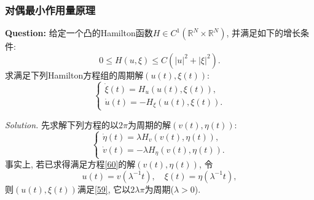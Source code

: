 \subsubsection{对偶最小作用量原理}

\textbf{Question:} 给定一个凸的Hamilton函数$H \in C^1(\mathbb{R}^N \times \mathbb{R}^N)$, 并满足如下的增长条件:
\begin{equation*}
    0 \leq H(u, \xi) \leq C(|u|^2 + |\xi|^2).
\end{equation*}
求满足下列Hamilton方程组的周期解$(u(t), \xi(t))$:
\begin{equation}\label{59}
    \begin{cases}
        \dot \xi(t) = H_u(u(t), \xi(t)), \\ 
        \dot u(t) = -H_{\xi}(u(t), \xi(t)).
    \end{cases}
\end{equation}

\emph{Solution.} 先求解下列方程的以$2\pi$为周期的解$(v(t), \eta(t))$:
\begin{equation}\label{60}
    \begin{cases}
        \dot \eta(t) = \lambda H_v(v(t), \eta(t)), \\ 
        \dot v(t) = -\lambda H_{\eta}(v(t), \eta(t)).
    \end{cases}
\end{equation}
事实上, 若已求得满足方程\eqref{60}的解$(v(t), \eta(t))$, 令 
\begin{equation*}
    u(t) = v(\lambda^{-1}t), \quad \xi(t) = \eta(\lambda^{-1}t),
\end{equation*}
则$(u(t), \xi(t))$满足\eqref{59}, 它以$2\lambda\pi$为周期($\lambda > 0$).

